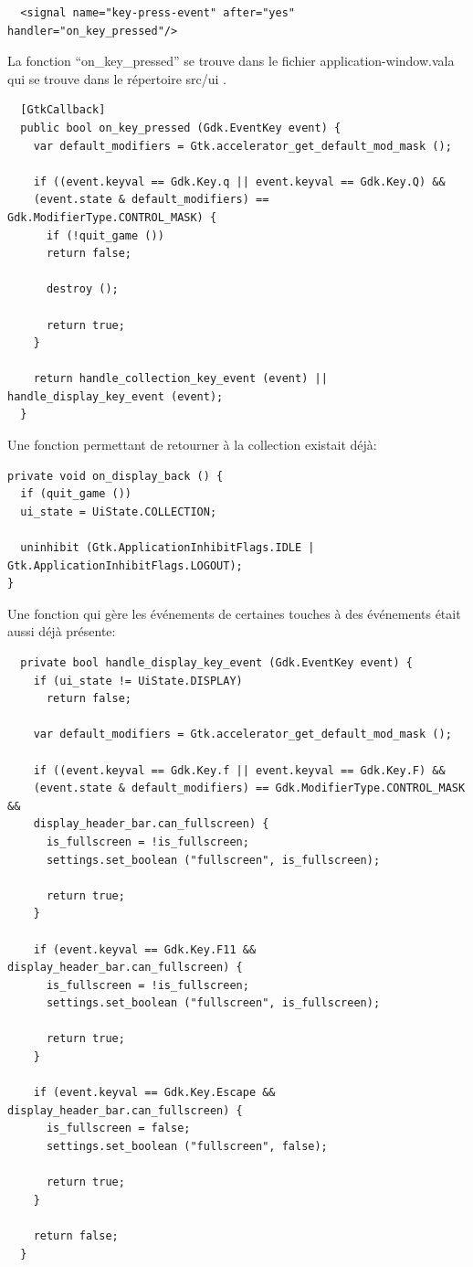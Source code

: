 \documentclass[12pt]{report}
\begin{document}
\begin{verbatim}
  <signal name="key-press-event" after="yes" handler="on_key_pressed"/>
\end{verbatim}

La fonction ``on\_key\_pressed'' se trouve dans le fichier
application-window.vala qui se trouve dans le répertoire src/ui .

\begin{verbatim}
  [GtkCallback]
  public bool on_key_pressed (Gdk.EventKey event) {
    var default_modifiers = Gtk.accelerator_get_default_mod_mask ();

    if ((event.keyval == Gdk.Key.q || event.keyval == Gdk.Key.Q) &&
    (event.state & default_modifiers) == Gdk.ModifierType.CONTROL_MASK) {
      if (!quit_game ())
      return false;

      destroy ();

      return true;
    }

    return handle_collection_key_event (event) || handle_display_key_event (event);
  }
\end{verbatim}

Une fonction permettant de retourner à la collection existait déjà:

\begin{verbatim}
private void on_display_back () {
  if (quit_game ())
  ui_state = UiState.COLLECTION;

  uninhibit (Gtk.ApplicationInhibitFlags.IDLE | Gtk.ApplicationInhibitFlags.LOGOUT);
}
\end{verbatim}

Une fonction qui gère les événements de certaines touches à des événements
était aussi déjà présente:

\begin{verbatim}
  private bool handle_display_key_event (Gdk.EventKey event) {
    if (ui_state != UiState.DISPLAY)
      return false;

    var default_modifiers = Gtk.accelerator_get_default_mod_mask ();

    if ((event.keyval == Gdk.Key.f || event.keyval == Gdk.Key.F) &&
    (event.state & default_modifiers) == Gdk.ModifierType.CONTROL_MASK &&
    display_header_bar.can_fullscreen) {
      is_fullscreen = !is_fullscreen;
      settings.set_boolean ("fullscreen", is_fullscreen);

      return true;
    }

    if (event.keyval == Gdk.Key.F11 && display_header_bar.can_fullscreen) {
      is_fullscreen = !is_fullscreen;
      settings.set_boolean ("fullscreen", is_fullscreen);

      return true;
    }

    if (event.keyval == Gdk.Key.Escape && display_header_bar.can_fullscreen) {
      is_fullscreen = false;
      settings.set_boolean ("fullscreen", false);

      return true;
    }
    
    return false;
  }
\end{verbatim}
\end{document}
